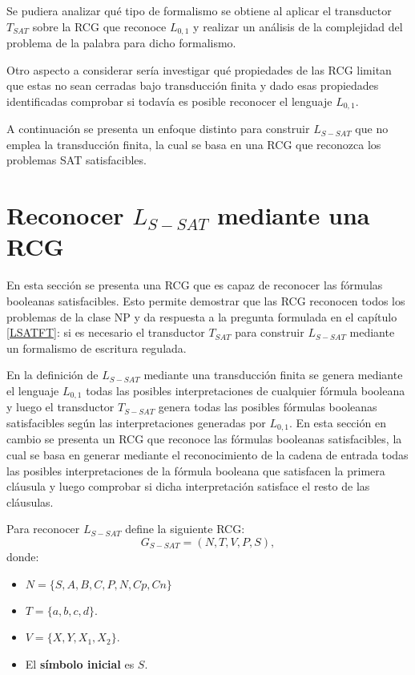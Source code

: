 \documentclass[12pt]{article}
\begin{document}
Se pudiera analizar qué tipo de formalismo se obtiene al aplicar
el transductor $T_{SAT}$ sobre la RCG que reconoce $L_{0,1}$ y realizar un análisis de la complejidad del
problema de la palabra para dicho formalismo.

Otro aspecto a considerar sería investigar qué propiedades de las RCG limitan que estas no sean cerradas
bajo transducción finita y dado esas propiedades identificadas comprobar si todavía es posible reconocer
el lenguaje $L_{0,1}$.

A continuación se presenta un enfoque distinto para construir $L_{S-SAT}$ que no emplea la transducción
finita, la cual se basa en una RCG que reconozca los problemas SAT satisfacibles.

\section{Reconocer $L_{S-SAT}$ mediante una RCG}

En esta sección se presenta una RCG que es capaz de reconocer las fórmulas booleanas satisfacibles. Esto permite demostrar que las
RCG reconocen todos los problemas de la clase NP y da respuesta a la pregunta formulada en el capítulo \ref{LSATFT}: si es necesario
el transductor $T_{SAT}$ para construir $L_{S-SAT}$ mediante un formalismo de escritura regulada.

En la definición de $L_{S-SAT}$ mediante una transducción finita se genera mediante el lenguaje $L_{0,1}$
todas las posibles interpretaciones de cualquier fórmula booleana y luego el transductor $T_{S-SAT}$ genera
todas las posibles fórmulas booleanas satisfacibles según las interpretaciones generadas por $L_{0,1}$.
En esta sección en cambio se presenta un RCG que reconoce las fórmulas booleanas satisfacibles, la cual se
basa en generar mediante el reconocimiento de la cadena de entrada todas las posibles
interpretaciones de la fórmula booleana que satisfacen la primera cláusula y luego comprobar si dicha
interpretación satisface el resto de las cláusulas.


Para reconocer $L_{S-SAT}$ define la siguiente RCG:
\[
    G_{S-SAT} = (N, T, V, P, S),
\]
donde:

\begin{itemize}
    \item $N=\{S,A,B,C,P,N,Cp,Cn\}$
    \item $T=\{a,b,c,d\}$.
    \item $V=\{X,Y,X_1,X_2\}$.
    \item El \textbf{símbolo inicial} es $S$.
\end{itemize}
\end{document}
